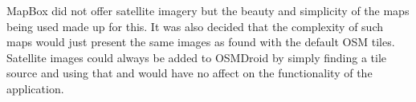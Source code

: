 MapBox did not offer satellite imagery but the beauty and simplicity of the maps being used made up for this. It was also decided that the complexity of such maps would just present the same images as found with the default OSM tiles. Satellite images could always be added to OSMDroid by simply finding a tile source and using that and would have no affect on the functionality of the application. 

